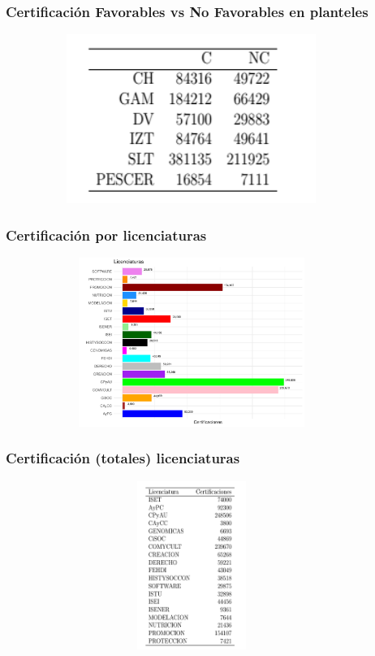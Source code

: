 \documentclass[xcolor=dvipsnames]{beamer}
\begin{document}
\begin{frame}\frametitle{Certificaci\'on Favorables vs No Favorables en planteles}
\begin{figure}[H]
\centering
\includegraphics[width=10cm,height=5.5cm]{Tablas/CertificacionFnFPlanteles.png}
\end{figure}
\end{frame}

\begin{frame}\frametitle{Certificaci\'on por licenciaturas}
\begin{figure}[H]
\centering
\includegraphics[width=10cm,height=5.5cm]{Imagenes/graficoCertificacionesLicenciaturas.pdf}
\end{figure}
\end{frame}

\begin{frame}\frametitle{Certificaci\'on (totales) licenciaturas}
\begin{figure}[H]
\centering
\includegraphics[width=10cm,height=5.5cm]{Tablas/CertificacionTtlLic.png}
\end{figure}
\end{frame}
\end{document}
